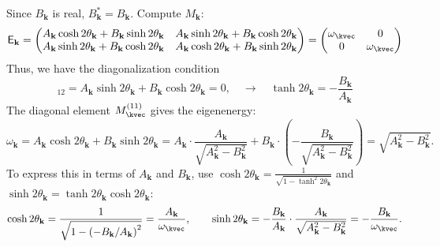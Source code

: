 Since $ B_{\mathbf{k}} $ is real, $ B_{\mathbf{k}}^{*} = B_{\mathbf{k}} $.
Compute $ M_{\mathbf{k}} $:
\begin{equation}
    \mathsf{E}_{\mathbf{k}}
    = 
    \begin{pmatrix}
        A_{\mathbf{k}} \cosh 2\theta_{\mathbf{k}} + B_{\mathbf{k}} \sinh 2\theta_{\mathbf{k}} 
        & A_{\mathbf{k}} \sinh 2\theta_{\mathbf{k}} + B_{\mathbf{k}} \cosh 2\theta_{\mathbf{k}}\\
        A_{\mathbf{k}} \sinh 2\theta_{\mathbf{k}} + B_{\mathbf{k}} \cosh 2\theta_{\mathbf{k}} 
        & A_{\mathbf{k}} \cosh 2\theta_{\mathbf{k}} + B_{\mathbf{k}} \sinh 2\theta_{\mathbf{k}} 
    \end{pmatrix}
    = 
    \begin{pmatrix}
        \omega_{\kvec}
        & 0 \\ 0 & 
        \omega_{\kvec}
    \end{pmatrix}
\end{equation}
Thus, we have the diagonalization condition
\begin{equation}
    [\mathsf{E}_{\mathbf{k}}]_{12} = A_{\mathbf{k}} \sinh 2\theta_{\mathbf{k}} + B_{\mathbf{k}} \cosh 2\theta_{\mathbf{k}} = 0,
    \quad \rightarrow \quad
    \tanh 2\theta_{\mathbf{k}} = -\frac{B_{\mathbf{k}}}{A_{\mathbf{k}}}
\end{equation}
The diagonal element $M_{\kvec}^{(11)}$ gives the eigenenergy:
\begin{equation}
    \omega_{\mathbf{k}} 
    = A_{\mathbf{k}} \cosh 2\theta_{\mathbf{k}} + B_{\mathbf{k}} \sinh 2\theta_{\mathbf{k}} 
    = A_{\mathbf{k}} \cdot \frac{A_{\mathbf{k}}}{\sqrt{A_{\mathbf{k}}^2 - B_{\mathbf{k}}^2}} + B_{\mathbf{k}} \cdot \left(-\frac{B_{\mathbf{k}}}{\sqrt{A_{\mathbf{k}}^2 - B_{\mathbf{k}}^2}}\right) 
    = \sqrt{A_{\mathbf{k}}^2 - B_{\mathbf{k}}^2}.
\end{equation}
To express this in terms of $ A_{\mathbf{k}} $ and $ B_{\mathbf{k}} $, use $ \cosh 2\theta_{\mathbf{k}} = \frac{1}{\sqrt{1 - \tanh^2 2\theta_{\mathbf{k}}}} $ and $ \sinh 2\theta_{\mathbf{k}} = \tanh 2\theta_{\mathbf{k}} \cosh 2\theta_{\mathbf{k}} $:
\begin{equation*}
    \cosh 2\theta_{\mathbf{k}} = \frac{1}{\sqrt{1 - \left(-B_{\mathbf{k}} / A_{\mathbf{k}} \right)^2}} = \frac{A_{\mathbf{k}}}{\omega_{\kvec}},  
    \qquad 
    \sinh 2\theta_{\mathbf{k}} = -\frac{B_{\mathbf{k}}}{A_{\mathbf{k}}} \cdot \frac{A_{\mathbf{k}}}{\sqrt{A_{\mathbf{k}}^2 - B_{\mathbf{k}}^2}} = -\frac{B_{\mathbf{k}}}{\omega_{\kvec}}.
\end{equation*}


